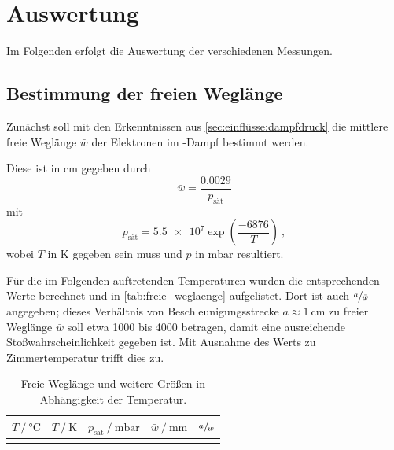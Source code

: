 \section{Auswertung}
\label{sec:auswertung}

Im Folgenden erfolgt die Auswertung der verschiedenen Messungen.

\subsection{Bestimmung der freien Weglänge}

Zunächst soll mit den Erkenntnissen aus \autoref{sec:einflüsse:dampfdruck}
die mittlere freie Weglänge $\bar{w}$ der Elektronen im -Dampf bestimmt werden.

Diese ist in $\si{\centi\meter}$ gegeben durch
\begin{equation*}
    \bar{w} = \frac{\num{0.0029}}{p_\text{sät}}
\end{equation*}
mit
\begin{equation*}
    p_\text{sät} = \num{5.5e7} \exp{\left(\frac{-6876}{T}\right)} \ ,
\end{equation*}
wobei $T$ in $\si{\kelvin}$ gegeben sein muss
und $p$ in $\si{\milli\bar}$ resultiert.

Für die im Folgenden auftretenden Temperaturen wurden die entsprechenden Werte berechnet
und in \autoref{tab:freie_weglaenge} aufgelistet.
Dort ist auch $\sfrac{a}{\bar{w}}$ angegeben;
dieses Verhältnis von Beschleunigungsstrecke $a \approx \SI{1}{\centi\meter}$ %
zu freier Weglänge $\bar{w}$
soll etwa 1000 bis 4000 betragen,
damit eine ausreichende Stoßwahrscheinlichkeit gegeben ist.
Mit Ausnahme des Werts zu Zimmertemperatur trifft dies zu.

\begin{table}
  \centering
  \caption{Freie Weglänge und weitere Größen in Abhängigkeit der Temperatur.}
  \label{tab:freie_weglaenge}
  \begin{tabular}{S[table-format=3.1] S[table-format=3.1] S[table-format=2.5] S[table-format=2.6] S[table-format=4.2]}
  \toprule
  {$T \mathbin{/} \si{\celsius}$} &
  {$T \mathbin{/} \si{\kelvin}$} &
  {$p_\text{sät} \mathbin{/} \si{\milli\bar}$} &
  {$\bar{w} \mathbin{/} \si{\milli\meter}$} &
  {$\sfrac{a}{\bar{w}}$} \\
  \midrule
  \bottomrule
  \end{tabular}
\end{table}


